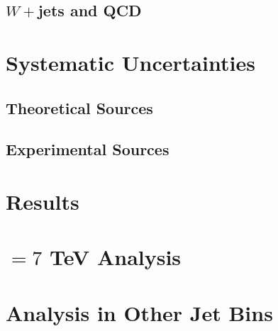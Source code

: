 \subsection{$W+$jets and QCD}



\section{Systematic Uncertainties}

\subsection{Theoretical Sources}

\subsection{Experimental Sources}

\section{Results}

\section{\sqrts$=7$ TeV Analysis}

\section{\hwwlnln Analysis in Other Jet Bins}




